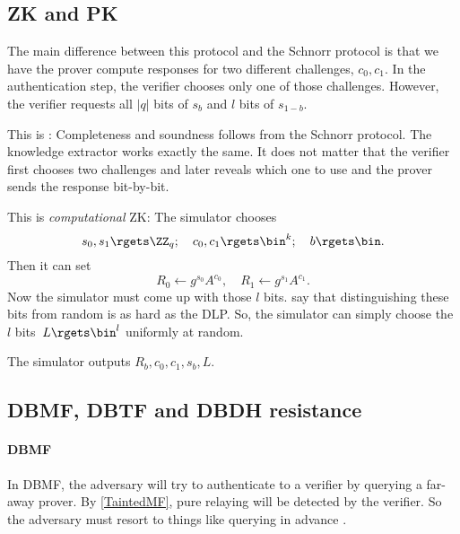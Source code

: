 \subsection{\Acl*{ZK} and \acl*{PK}}\label{nbit-ZKPK}

The main difference between this protocol and the Schnorr protocol is that we 
have the prover compute responses for two different challenges, \(c_0, c_1\).
In the authentication step, the verifier chooses only one of those challenges.
However, the verifier requests all \(|q|\) bits of \(s_b\) and \(l\) bits of 
\(s_{1-b}\).

This is :
Completeness and soundness follows from the Schnorr protocol.
The knowledge extractor works exactly the same.
It does not matter that the verifier first chooses two challenges and later 
reveals which one to use and the prover sends the response bit-by-bit.

This is \emph{computational} \acl{ZK}:
The simulator chooses \[
  s_0, s_1\rgets \ZZ_q; \quad
  c_0, c_1\rgets \bin^k; \quad
  b\rgets \bin.
\]
Then it can set \[
  R_0\gets g^{s_0} A^{c_0}, \quad
  R_1\gets g^{s_1} A^{c_1}.
\]
Now the simulator must come up with those \(l\) bits.
 say that distinguishing these bits from random 
is as hard as the \ac{DLP}.
So, the simulator can simply choose the \(l\) bits~\(L\rgets \bin^l\) uniformly 
at random.

The simulator outputs \(R_b, c_0, c_1, s_b, L\).


\subsection{\acs*{DBMF}, \acs*{DBTF} and \acs*{DBDH} resistance}

\paragraph{\Acl{DBMF}}

In \ac{DBMF}, the adversary will try to authenticate to a verifier by querying 
a far-away prover.
By \cref{TaintedMF}, pure relaying will be detected by the verifier.
So the adversary must resort to things like querying in advance \etc.

